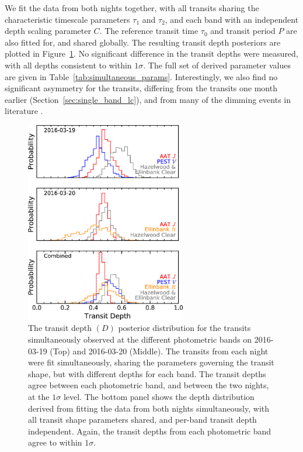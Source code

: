 \documentclass[useAMS,usenatbib]{mn2e}
\begin{document}
We fit the data from both nights together, with all transits sharing the characteristic timescale parameters $\tau_1$ and $\tau_2$, and each band with an independent depth scaling parameter $C$. The reference transit time $\tau_0$ and transit period $P$ are also fitted for, and shared globally. The resulting transit depth posteriors are plotted in Figure~\ref{fig:depth_hist}. No significant difference in the transit depths were measured, with all depths consistent to within $1\sigma$. The full set of derived parameter values are given in Table~\ref{tab:simultaneous_params}. Interestingly, we also find no significant asymmetry for the transits, differing from the transits one month earlier (Section~\ref{sec:single_band_lc}), and from many of the dimming events in literature \citep[e.g. FLWO transits from ][]{2015Natur.526..546V}. 

\begin{figure}
    \centering
    \includegraphics[width=7cm]{plots/depth_hist.eps}
    \caption{The transit depth $(D)$ posterior distribution for the transits simultaneously observed at the different photometric bands on 2016-03-19 (Top) and 2016-03-20 (Middle). The transits from each night were fit simultaneously, sharing the parameters governing the transit shape, but with different depths for each band. The transit depths agree between each photometric band, and between the two nights, at the $1\sigma$ level. The bottom panel shows the depth distribution derived from fitting the data from both nights simultaneously, with all transit shape parameters shared, and per-band transit depth independent. Again, the transit depths from each photometric band agree to within $1\sigma$.}
    \label{fig:depth_hist}
\end{figure}
\end{document}

